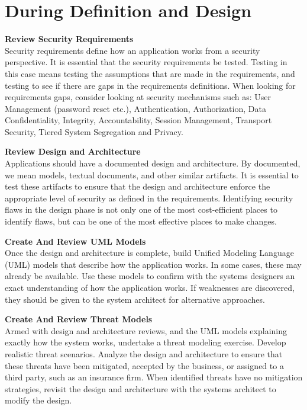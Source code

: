 	\section{During Definition and Design}

		{\bf Review Security Requirements} \\
			Security requirements define how an application works from a security perspective. It is essential 
			that the security requirements be tested. Testing in this case means testing the assumptions 
			that are made in the requirements, and testing to see if there are gaps in the requirements 
			definitions. When looking for requirements gaps, consider looking at security mechanisms such as:
			User Management (password reset etc.), Authentication, Authorization, Data Confidentiality, 
			Integrity, Accountability, Session Management, Transport Security, Tiered System Segregation
			and Privacy.

		{\bf Review Design and Architecture} \\
			Applications should have a documented design and architecture. By documented, we mean 
			models, textual documents, and other similar artifacts. It is essential to test these 
			artifacts to ensure that the design and architecture enforce the appropriate level of 
			security as defined in the requirements. Identifying security flaws in the design phase 
			is not only one of the most cost-efficient places to identify flaws, but can be one of 
			the most effective places to make changes.

		{\bf Create And Review UML Models} \\
			Once the design and architecture is complete, build Unified Modeling Language (UML) 
			models that describe how the application works. In some cases, these may already be 
			available. Use these models to confirm with the systems designers an exact understanding 
			of how the application works. If weaknesses are discovered, they should be given to 
			the system architect for alternative approaches.

		{\bf Create And Review Threat Models} \\
			Armed with design and architecture reviews, and the UML models explaining exactly how 
			the system works, undertake a threat modeling exercise. Develop realistic threat 
			scenarios. Analyze the design and architecture to ensure that these threats have been 
			mitigated, accepted by the business, or assigned to a third party, such as an insurance 
			firm. When identified threats have no mitigation strategies, revisit the design and 
			architecture with the systems architect to modify the design.


